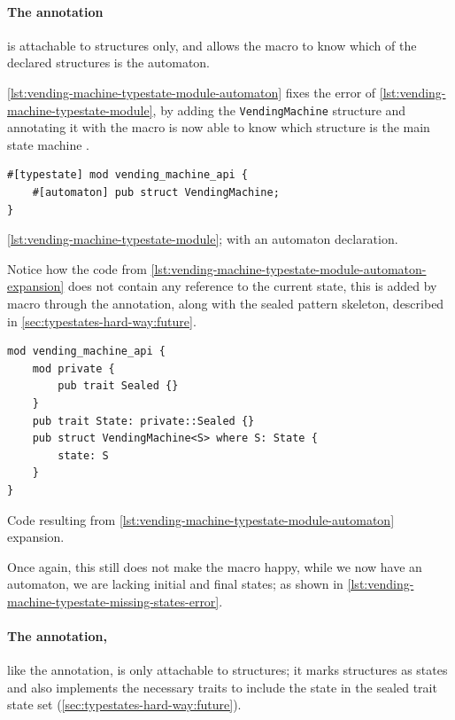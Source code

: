 \paragraph{The  annotation} is attachable to structures only, %
and allows the macro to know which of the declared structures is the automaton.

\autoref{lst:vending-machine-typestate-module-automaton} fixes the error of \autoref{lst:vending-machine-typestate-module},
by adding the \texttt{VendingMachine} structure and annotating it with 
the macro is now able to know which structure is the main state machine .

\begin{listing}
    \begin{verbatim}
#[typestate] mod vending_machine_api {
    #[automaton] pub struct VendingMachine;
}
    \end{verbatim}
    \caption{\autoref{lst:vending-machine-typestate-module}; with an automaton declaration.}
    \label{lst:vending-machine-typestate-module-automaton}
\end{listing}

Notice how the code from \autoref{lst:vending-machine-typestate-module-automaton-expansion} does not contain any reference to the current state,
this is added by macro through the  annotation,
along with the sealed pattern skeleton, described in \autoref{sec:typestates-hard-way:future}.

\begin{listing}
    \begin{verbatim}
mod vending_machine_api {
    mod private {
        pub trait Sealed {}
    }
    pub trait State: private::Sealed {}
    pub struct VendingMachine<S> where S: State {
        state: S
    }
}
    \end{verbatim}
    \caption{Code resulting from \autoref{lst:vending-machine-typestate-module-automaton} expansion.}
    \label{lst:vending-machine-typestate-module-automaton-expansion}
\end{listing}

Once again, this still does not make the macro happy, while we now have an automaton, we are lacking initial and final states;
as shown in \autoref{lst:vending-machine-typestate-missing-states-error}.

\paragraph{The  annotation,} like the  annotation, is only attachable to structures;
it marks structures as states and also implements the necessary traits to include the state in the sealed trait state set (\autoref{sec:typestates-hard-way:future}).


